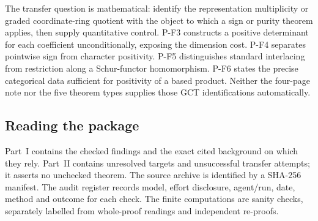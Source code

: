 The transfer question is mathematical: identify the representation
multiplicity or graded coordinate-ring quotient with the object to which
a sign or purity theorem applies, then supply quantitative control.
P-F3 constructs a positive determinant for each coefficient
unconditionally, exposing the dimension cost. P-F4 separates pointwise
sign from character positivity. P-F5 distinguishes standard interlacing
from restriction along a Schur-functor homomorphism. P-F6 states the
precise categorical data sufficient for positivity of a based product.
Neither the four-page note nor the five theorem types supplies those GCT
identifications automatically.

\subsection*{Reading the package}
Part~I contains the checked findings and the exact cited background on
which they rely. Part~II contains unresolved targets and unsuccessful
transfer attempts; it asserts no unchecked theorem. The source archive
is identified by a SHA-256 manifest. The audit register records model,
effort disclosure, agent/run, date, method and outcome for each check.
The finite computations are sanity checks, separately labelled from
whole-proof readings and independent re-proofs.
